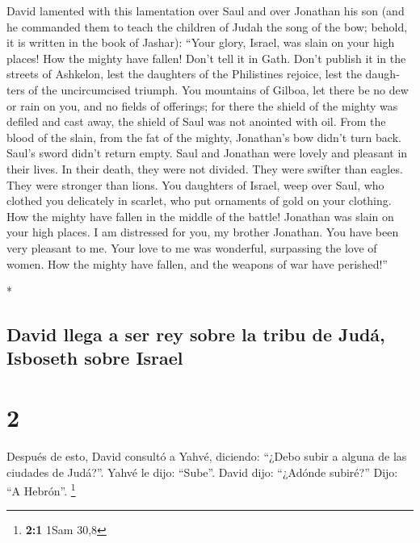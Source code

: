 \begin{paracol}{2}
\begin{otherlanguage}{english}
 David lamented with this lamentation over Saul and over
Jonathan his son  (and he commanded them to teach the
children of Judah the song of the bow; behold, it is written in the book
of Jashar):  ``Your glory, Israel, was slain on your high
places! How the mighty have fallen!  Don't tell it in
Gath. Don't publish it in the streets of Ashkelon, lest the daughters of
the Philistines rejoice, lest the daughters of the uncircumcised
triumph.  You mountains of Gilboa, let there be no dew or
rain on you, and no fields of offerings; for there the shield of the
mighty was defiled and cast away, the shield of Saul was not anointed
with oil.  From the blood of the slain, from the fat of
the mighty, Jonathan's bow didn't turn back. Saul's sword didn't return
empty.  Saul and Jonathan were lovely and pleasant in
their lives. In their death, they were not divided. They were swifter
than eagles. They were stronger than lions.  You
daughters of Israel, weep over Saul, who clothed you delicately in
scarlet, who put ornaments of gold on your clothing.  How
the mighty have fallen in the middle of the battle! Jonathan was slain
on your high places.  I am distressed for you, my brother
Jonathan. You have been very pleasant to me. Your love to me was
wonderful, surpassing the love of women.  How the mighty
have fallen, and the weapons of war have perished!''

\end{otherlanguage}

\switchcolumn[0]*

\hypertarget{david-llega-a-ser-rey-sobre-la-tribu-de-juduxe1-isboseth-sobre-israel}{%
\subsection{David llega a ser rey sobre la tribu de Judá, Isboseth sobre
Israel}\label{david-llega-a-ser-rey-sobre-la-tribu-de-juduxe1-isboseth-sobre-israel}}

\hypertarget{section-2}{%
\section{2}\label{section-2}}

 Después de esto, David consultó a Yahvé, diciendo:
``¿Debo subir a alguna de las ciudades de Judá?''. Yahvé le dijo:
``Sube''. David dijo: ``¿Adónde subiré?'' Dijo: ``A Hebrón''.
\footnote{\textbf{2:1} 1Sam 30,8}


\end{paracol}
